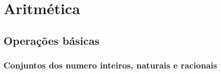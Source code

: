 \chapter{Aritmética}
\section{Operações básicas }
	\subsection{Conjuntos dos numero inteiros, naturais e racionais}

